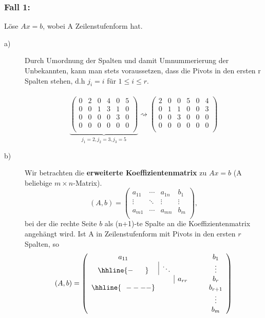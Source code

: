 \documentclass{scrbook}
\begin{document}
\subsubsection*{Fall 1:} Löse \(Ax=b\), wobei A Zeilenstufenform hat.\\
\begin{description}
\item[a)] Durch Umordnung der Spalten und damit Umnummerierung der Unbekannten, kann man stets voraussetzen, dass die Pivots in den ersten r Spalten stehen, d.h \(j_i=i\) für \(1\leq i \leq r\).\\
\\
\[\underbrace{\left(
\begin{array}{cccccc}
0&2&0&4&0&5\\
0&0&1&3&1&0\\
0&0&0&0&3&0\\
0&0&0&0&0&0\\
\end{array}\right)}_{j_1=2,j_2=3,j_3=5}
\rightsquigarrow
\left(\begin{array}{cccccc}
2&0&0&5&0&4\\
0&1&1&0&0&3\\
0&0&3&0&0&0\\
0&0&0&0&0&0\\
\end{array}\right)
\]
\item[b)] Wir betrachten die \textbf{erweiterte Koeffizientenmatrix} zu \(Ax=b\) (A beliebige \(m \times n\)-Matrix).
\[(A,b)=\left(\begin{array}{cccc}
a_{11} &\cdots&a_{1n}&b_1\\
\vdots&\ddots&\vdots&\vdots\\
a_{m1} &\cdots&a_{mn}&b_m\\
\end{array}\right),
\]
bei der die rechte Seite $b$ als (n+1)-te Spalte an die Koeffizientenmatrix angehängt wird. Ist A in Zeilenstufenform mit Pivots in den ersten $r$ Spalten, so
\[(A,b) =
\left(\begin{array}{cccccc}
a_{11}&&&&&b_1\\
\hhline{-~~~~~}
&\multicolumn{1}{|c}{\ddots}&&&&\vdots\\
&&\multicolumn{1}{|c}{a_{rr}}&&&b_r\\
\hhline{~~----}
&&&&&b_{r+1}\\
&&&&&\vdots\\
&&&&&b_m
\end{array}\right)
\]
\end{description}
\end{document}
